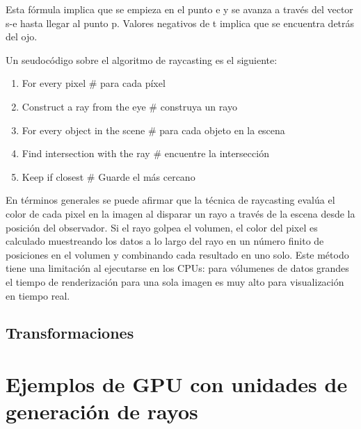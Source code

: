 Esta fórmula implica que se empieza en el punto e y se avanza a través del vector s-e hasta llegar al punto p. Valores negativos de t implica que se encuentra detrás del ojo.

Un seudocódigo sobre el algoritmo de raycasting es el siguiente:

\begin{enumerate}

\item For every pixel \# para cada píxel 
\item \hspace{5 mm} Construct a ray from the eye \hspace{3 mm} \# construya un rayo
\item \hspace{5 mm} For every object in the scene \hspace{3 mm} \# para cada objeto en la escena
\item \hspace{10 mm}	 Find intersection with the ray \hspace{3 mm} \# encuentre la intersección 	
\item \hspace{10 mm} Keep if closest 				\hspace{3 mm} \# Guarde el más cercano

\end{enumerate}

En términos generales se puede afirmar que la técnica de raycasting evalúa el color de cada pixel en la imagen al disparar un rayo a través de la escena desde la posición del observador. Si el rayo golpea el volumen, el color del pixel es calculado muestreando los datos a lo largo del rayo en un número finito de posiciones en el volumen  y combinando cada resultado en uno solo. Este método tiene una limitación al ejecutarse en los CPUs: para vólumenes de datos grandes el tiempo de renderización para una sola imagen es muy alto para visualización en tiempo real.

\subsection{Transformaciones}



\section{Ejemplos de GPU con unidades de generación de rayos}

